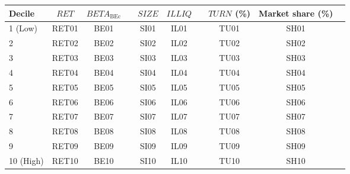\begin{tabular}{@{}lccccccccc@{}}
	\toprule
	Decile & $\textit{RET}$ & $\textit{BETA}_\textrm{BEc}$ && $\textit{SIZE}$ & $\textit{ILLIQ}$ && $\textit{TURN}$ (\%) & Market share (\%) \\ \midrule
1 (Low) & RET01 & BE01 && SI01 & IL01 && TU01 & SH01 \\
2       & RET02 & BE02 && SI02 & IL02 && TU02 & SH02 \\
3       & RET03 & BE03 && SI03 & IL03 && TU03 & SH03 \\
4       & RET04 & BE04 && SI04 & IL04 && TU04 & SH04 \\
5       & RET05 & BE05 && SI05 & IL05 && TU05 & SH05 \\
6       & RET06 & BE06 && SI06 & IL06 && TU06 & SH06 \\
7       & RET07 & BE07 && SI07 & IL07 && TU07 & SH07 \\
8       & RET08 & BE08 && SI08 & IL08 && TU08 & SH08 \\
9       & RET09 & BE09 && SI09 & IL09 && TU09 & SH09 \\
10 (High) & RET10 & BE10 && SI10 & IL10 && TU10 & SH10 \\
	\bottomrule
\end{tabular}